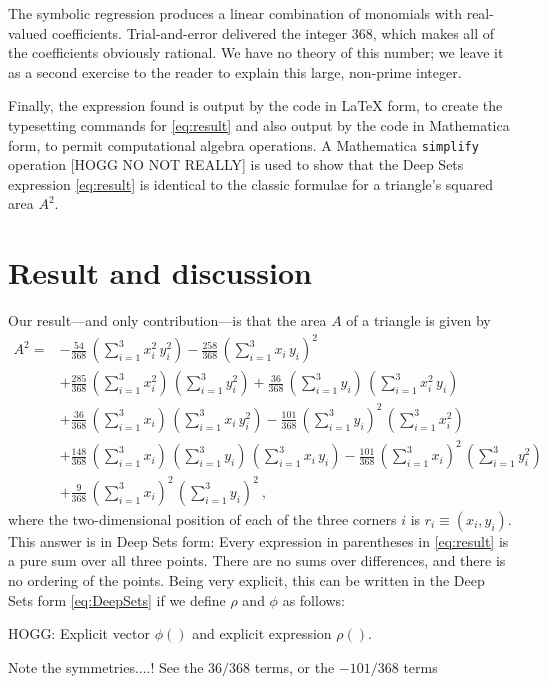 \documentclass[12pt]{article}
\begin{document}
The symbolic regression produces a linear combination of monomials with real-valued coefficients.
Trial-and-error delivered the integer 368, which makes all of the coefficients obviously rational.
We have no theory of this number; we leave it as a second exercise to the reader to explain this large, non-prime integer.

Finally, the expression found is output by the code in LaTeX form, to create the typesetting commands for \eqref{eq:result} and also output by the code in Mathematica form, to permit computational algebra operations.
A Mathematica \texttt{simplify} operation [HOGG NO NOT REALLY] is used to show that the Deep Sets expression \eqref{eq:result} is identical to the classic formulae for a triangle's squared area $A^2$.

\section{Result and discussion}\label{sec:result}
Our result---and only contribution---is that the area $A$ of a triangle is given by
\begin{align}
A^2 = &
-\frac{ 54}{368}\,(\sum_{i=1}^3 x_i^2\,y_i^2) 
-\frac{258}{368}\,(\sum_{i=1}^3 x_i\,y_i)^2 \nonumber \\ &
+\frac{285}{368}\,(\sum_{i=1}^3 x_i^2)\,(\sum_{i=1}^3 y_i^2) 
+\frac{ 36}{368}\,(\sum_{i=1}^3 y_i)\,(\sum_{i=1}^3 x_i^2\,y_i) \nonumber \\ &
+\frac{ 36}{368}\,(\sum_{i=1}^3 x_i)\,(\sum_{i=1}^3 x_i\,y_i^2) 
-\frac{101}{368}\,(\sum_{i=1}^3 y_i)^2\,(\sum_{i=1}^3 x_i^2) \nonumber \\ &
+\frac{148}{368}\,(\sum_{i=1}^3 x_i)\,(\sum_{i=1}^3 y_i)\,(\sum_{i=1}^3 x_i\,y_i) 
-\frac{101}{368}\,(\sum_{i=1}^3 x_i)^2\,(\sum_{i=1}^3 y_i^2) \nonumber \\ &
+\frac{  9}{368}\,(\sum_{i=1}^3 x_i)^2\,(\sum_{i=1}^3 y_i)^2 ~, \label{eq:result}
\end{align}
where the two-dimensional position of each of the three corners $i$ is $r_i \equiv (x_i, y_i)$.
This answer is in Deep Sets form:
Every expression in parentheses in \eqref{eq:result} is a pure sum over all three points.
There are no sums over differences, and there is no ordering of the points.
Being very explicit, this can be written in the Deep Sets form \eqref{eq:DeepSets} if we define $\rho$ and $\phi$ as follows:

HOGG: Explicit vector $\phi()$ and explicit expression $\rho()$.

Note the symmetries....! See the $36/368$ terms, or the $-101/368$ terms
\end{document}
